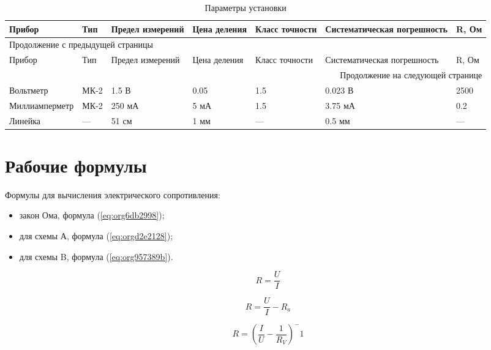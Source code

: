 \documentclass[14pt]{extarticle}
\begin{document}
\begin{longtable}{|p{3.9cm}|l|p{2cm}|p{1.3cm}|p{1.2cm}|p{3.6cm}|p{1.2cm}|}
\caption{\label{tab:org0eccdb8}Параметры установки}
\\[0pt]
\hline
Прибор & Тип & Предел измерений & Цена деления & Класс точности & Систематическая погрешность & R, Ом\\[0pt]
\hline
\endfirsthead
\multicolumn{7}{l}{Продолжение с предыдущей страницы} \\[0pt]
\hline

Прибор & Тип & Предел измерений & Цена деления & Класс точности & Систематическая погрешность & R, Ом \\[0pt]

\hline
\endhead
\hline\multicolumn{7}{r}{Продолжение на следующей странице} \\
\endfoot
\endlastfoot
\hline
Вольтметр & МК-2 & 1.5 В & 0.05 & 1.5 & 0.023 В & 2500\\[0pt]
\hline
Миллиамперметр & МК-2 & 250 мА & 5 мА & 1.5 & 3.75 мА & 0.2\\[0pt]
\hline
Линейка & --- & 51 см & 1 мм & --- & 0.5 мм & ---\\[0pt]
\hline
\end{longtable}

\section{Рабочие формулы}
\label{sec:org8b91a45}

Формулы для вычисления электрического сопротивления:

\begin{itemize}
\item закон Ома, формула (\ref{eq:org6db2998});
\item для схемы А, формула (\ref{eq:orgd2e2128});
\item для схемы B, формула (\ref{eq:org957389b}).
\end{itemize}

\begin{equation}
\label{eq:org6db2998}
R = \frac{U}{I}
\end{equation}

\begin{equation}
\label{eq:orgd2e2128}
R = \frac{U}{I} - R_a
\end{equation}

\begin{equation}
\label{eq:org957389b}
R = (\frac{I}{U} - \frac{1}{R_V})^-1
\end{equation}
\end{document}
